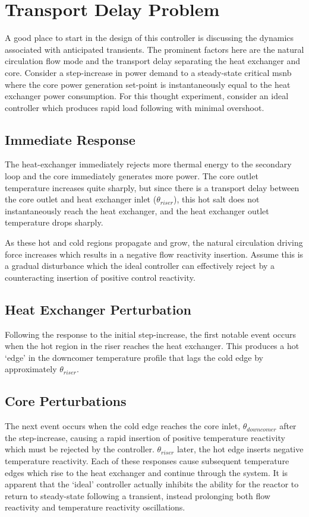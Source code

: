 \section{Transport Delay Problem}
A good place to start in the design of this controller is discussing the dynamics associated with anticipated transients. The prominent factors here are the natural circulation flow mode and the transport delay separating the heat exchanger and core. Consider a step-increase in power demand to a steady-state critical \acs{msnb} where the core power generation set-point is instantaneously equal to the heat exchanger power consumption. For this thought experiment, consider an ideal controller which produces rapid load following with minimal overshoot.

\subsection{Immediate Response}
The heat-exchanger immediately rejects more thermal energy to the secondary loop and the core immediately generates more power. The core outlet temperature increases quite sharply, but since there is a transport delay between the core outlet and heat exchanger inlet ($\theta_{riser}$), this hot salt does not instantaneously reach the heat exchanger, and the heat exchanger outlet temperature drops sharply. 

As these hot and cold regions propagate and grow, the natural circulation driving force increases which results in a negative flow reactivity insertion. Assume this is a gradual disturbance which the ideal controller can effectively reject by a counteracting insertion of positive control reactivity. 

\subsection{Heat Exchanger Perturbation}
Following the response to the initial step-increase, the first notable event occurs when the hot region in the riser reaches the heat exchanger. This produces a hot `edge' in the downcomer temperature profile that lags the cold edge by approximately $\theta_{riser}$.

\subsection{Core Perturbations}
The next event occurs when the cold edge reaches the core inlet, $\theta_{downcomer}$ after the step-increase, causing a rapid insertion of positive temperature reactivity which must be rejected by the controller. $\theta_{riser}$ later, the hot edge inserts negative temperature reactivity. Each of these responses cause subsequent temperature edges which rise to the heat exchanger and continue through the system. It is apparent that the `ideal' controller actually inhibits the ability for the reactor to return to steady-state following a transient, instead prolonging both flow reactivity and temperature reactivity oscillations.

